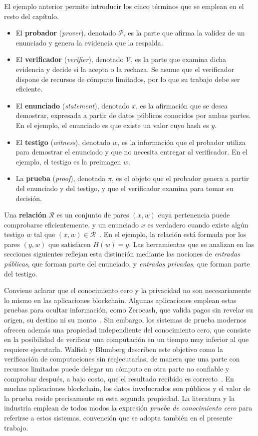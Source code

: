 El ejemplo anterior permite introducir los cinco términos que se emplean en el resto del
capítulo.

\begin{itemize}
	\item El \textbf{probador} (\textit{prover}), denotado $\mathcal{P}$, es la parte que afirma
	la validez de un enunciado y genera la evidencia que la respalda.
	\item El \textbf{verificador} (\textit{verifier}), denotado $\mathcal{V}$, es la parte que
	examina dicha evidencia y decide si la acepta o la rechaza. Se asume que el verificador
	dispone de recursos de cómputo limitados, por lo que su trabajo debe ser eficiente.
	\item El \textbf{enunciado} (\textit{statement}), denotado $x$, es la afirmación que se desea
	demostrar, expresada a partir de datos públicos conocidos por ambas partes. En el ejemplo, el
	enunciado es que existe un valor cuyo hash es $y$.
	\item El \textbf{testigo} (\textit{witness}), denotado $w$, es la información que el probador
	utiliza para demostrar el enunciado y que no necesita entregar al verificador. En el ejemplo,
	el testigo es la preimagen $w$.
	\item La \textbf{prueba} (\textit{proof}), denotada $\pi$, es el objeto que el probador
	genera a partir del enunciado y del testigo, y que el verificador examina para tomar su
	decisión.
\end{itemize}

Una \textbf{relación} $\mathcal{R}$ es un conjunto de pares $(x, w)$ cuya pertenencia puede
comprobarse eficientemente, y un enunciado $x$ es verdadero cuando existe algún testigo $w$ tal
que $(x, w) \in \mathcal{R}$~\cite{goldreich2001foundations}. En el ejemplo, la relación está
formada por los pares $(y, w)$ que satisfacen $H(w) = y$. Las herramientas que se analizan en
las secciones siguientes reflejan esta distinción mediante las nociones de \textit{entradas
públicas}, que forman parte del enunciado, y \textit{entradas privadas}, que forman parte del
testigo.

Conviene aclarar que el conocimiento cero y la privacidad no son necesariamente lo mismo en las
aplicaciones blockchain. Algunas aplicaciones emplean estas pruebas para ocultar información,
como Zerocash, que valida pagos sin revelar su origen, su destino ni su
monto~\cite{bensasson2014zerocash}. Sin embargo, los sistemas de prueba modernos ofrecen además
una propiedad independiente del conocimiento cero, que consiste en la posibilidad de verificar
una computación en un tiempo muy inferior al que requiere ejecutarla. Walfish y Blumberg
describen este objetivo como la verificación de computaciones sin reejecutarlas, de manera que
una parte con recursos limitados puede delegar un cómputo en otra parte no confiable y
comprobar después, a bajo costo, que el resultado recibido es
correcto~\cite{walfish2015verifying}. En muchas aplicaciones blockchain, los datos involucrados
son públicos y el valor de la prueba reside precisamente en esta segunda propiedad. La
literatura y la industria emplean de todos modos la expresión \textit{prueba de conocimiento
cero} para referirse a estos sistemas, convención que se adopta también en el presente trabajo.

